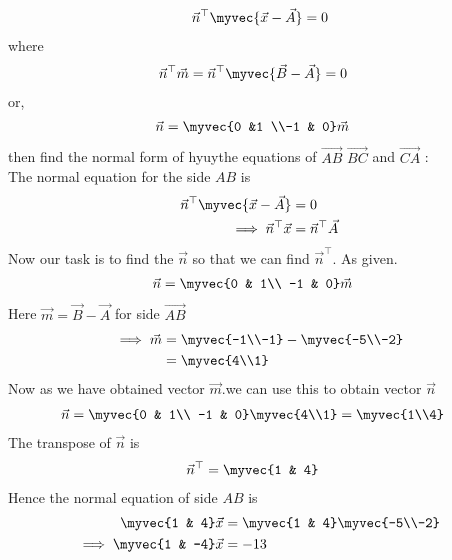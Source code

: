 \documentclass[11pt]{book}
\begin{document}
\begin{enumerate}[label=\thesection.\arabic*.,ref=\thesection.\theenumi]
\begin{align}
\vec{n}^{\top}\myvec{\vec{x}-\vec{A}}=0
\end{align}
where
\begin{align}
\vec{n}^{\top}\vec{m}&=\vec{n}^{\top}\myvec{\vec{B}-\vec{A}}=0
\end{align} 
or,\begin{align}
\vec{n}&=\myvec{0 &1 \\-1 & 0}\vec{m}
\end{align}
then find the normal form of hyuythe equations of $\vec{AB}$ $\vec{BC}$ and $\vec{CA}$
\solution:\\
       The normal equation for the side $AB$ is
\begin{align}
\vec{n}^{\top}\myvec{\vec{x}-\vec{A}}&=0\\
\implies
\vec{n}^{\top}\vec{x}&=\vec{n}^{\top}\vec{A}
\end{align}
Now our task is to find the $\vec{n}$ so that we can find $\vec{n}^{\top}$.
As given. 
\begin{align}
  \vec{n} &= \myvec{0 & 1\\
  -1 & 0}\vec{m}
\end{align}
Here $\vec{m} = \vec{B}- \vec{A}$ for side $\vec{AB}$
\begin{align}
\implies
\vec{m}&=\myvec{-1\\-1} - \myvec{-5\\-2}\\
&=\myvec{4\\1}
\end{align}
Now as we have obtained vector $\vec{m}$.we can use this to obtain vector $\vec{n}$
\begin{align}
\vec{n} &= \myvec{0 & 1\\
  -1 & 0}\myvec{4\\1}
 = \myvec{1\\4}
\end{align}
The transpose of $\vec{n}$ is
\begin{align}
  \vec{n}^{\top}&=\myvec{1 & 4}
\end{align}
Hence the normal equation of side $AB$ is 
\begin{align}
    \myvec{1 & 4}\vec{x}&=\myvec{1 & 4}\myvec{-5\\-2}\\
    \implies \myvec{1 & -4}\vec{x} &= -13
\end{align}
\begin{figure}[H]

\end{figure}
\end{enumerate}
\end{document}
